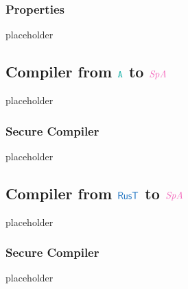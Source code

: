 \documentclass[a4paper,12pt]{article}
\begin{document}
\subsubsection{Properties}\label{subsec-spa-properties}
placeholder


\subsection{Compiler from $\obj{A}$ to $\ird{SpA}$}\label{subsec-a-to-spa}
placeholder
\subsubsection{Secure Compiler}\label{subsec-a-to-spa-seccomp}
placeholder

\subsection{Compiler from $\src{RusT}$ to $\ird{SpA}$}\label{subsec-rust-to-spa}
placeholder
\subsubsection{Secure Compiler}\label{subsec-rust-to-spa-seccomp}
placeholder


\clearpage



\printglossary
\end{document}
